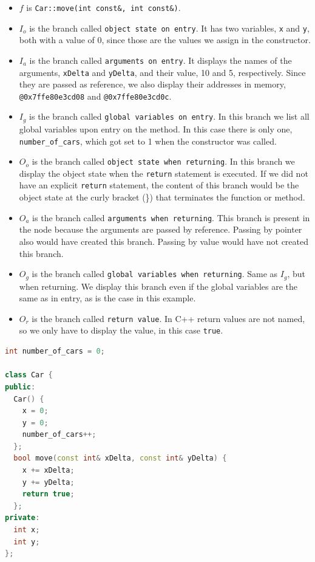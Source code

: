 \begin{definition}[Node]
\begin{exmp}
\begin{itemize}
    \item \(f\) is \verb|Car::move(int const&, int const&)|.
    \item \(I_o\) is the branch called \verb|object state on entry|. It has two variables, \verb|x| and \verb|y|, both with a value of 0, since those are the values we assign in the constructor.
    \item \(I_a\) is the branch called \verb|arguments on entry|. It displays the names of the arguments, \verb|xDelta| and \verb|yDelta|, and their value, 10 and 5, respectively. Since they are passed as reference, we also display their addresses in memory, \verb"@0x7ffe80e3cd08" and \verb"@0x7ffe80e3cd0c".
    \item \(I_g\) is the branch called \verb|global variables on entry|. In this branch we list all global variables upon entry on the method. In this case there is only one, \verb|number_of_cars|, which got set to 1 when the constructor was called.
    \item \(O_o\) is the branch called \verb|object state when returning|. In this branch we display the object state when the \verb|return| statement is executed. If we did not have an explicit \verb|return| statement, the content of this branch would be the object state at the curly bracket (\}) that terminates the function or method. 
    \item \(O_a\) is the branch called \verb|arguments when returning|. This branch is present in the node because the arguments are passed by reference. Passing by pointer also would have created this branch. Passing by value would have not created this branch.
    \item \(O_g\) is the branch called \verb|global variables when returning|. Same as \(I_g\), but when returning. We display this branch even if the global variables are the same as in entry, as is the case in this example.
    \item \(O_r\) is the branch called \verb|return value|. In C++ return values are not named, so we only have to display the value, in this case \verb|true|. 
\end{itemize}

\begin{lstlisting}[style=interfaces, language=C++, caption=Car class, frame=tb, label={lst:carClass}]
int number_of_cars = 0;

class Car {
public:
  Car() {
    x = 0;
    y = 0;
    number_of_cars++;
  };
  bool move(const int& xDelta, const int& yDelta) {
    x += xDelta;
    y += yDelta;
    return true;
  };
private:
  int x;
  int y;
};


\end{lstlisting}
\end{exmp}
\end{definition}
